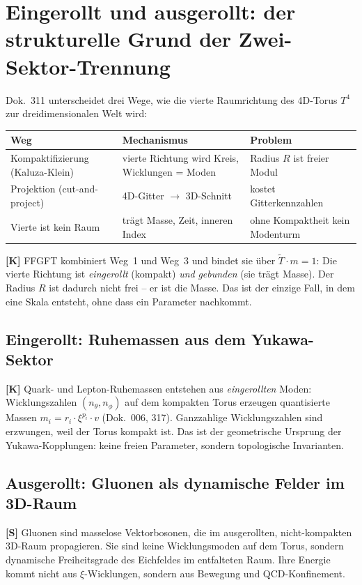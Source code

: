 \section{Eingerollt und ausgerollt: der strukturelle Grund der Zwei-Sektor-Trennung}

Dok.~311 unterscheidet drei Wege, wie die vierte Raumrichtung des
4D-Torus $T^4$ zur dreidimensionalen Welt wird:

\begin{center}
\begin{tabular}{lll}
\toprule
Weg & Mechanismus & Problem \\
\midrule
Kompaktifizierung (Kaluza-Klein) & vierte Richtung wird Kreis, Wicklungen = Moden
  & Radius $R$ ist freier Modul \\
Projektion (cut-and-project) & 4D-Gitter $\to$ 3D-Schnitt
  & kostet Gitterkennzahlen \\
Vierte ist kein Raum & trägt Masse, Zeit, inneren Index
  & ohne Kompaktheit kein Modenturm \\
\bottomrule
\end{tabular}
\end{center}

\textbf{[K]} FFGFT kombiniert Weg~1 und Weg~3 und bindet sie über
$\tilde{T} \cdot m = 1$: Die vierte Richtung ist \emph{eingerollt}
(kompakt) \emph{und} \emph{gebunden} (sie trägt Masse). Der Radius $R$
ist dadurch nicht frei -- er ist die Masse. Das ist der einzige Fall,
in dem eine Skala entsteht, ohne dass ein Parameter nachkommt.

\subsection{Eingerollt: Ruhemassen aus dem Yukawa-Sektor}

\textbf{[K]} Quark- und Lepton-Ruhemassen entstehen aus
\emph{eingerollten} Moden: Wicklungszahlen $(n_\theta, n_\phi)$ auf dem
kompakten Torus erzeugen quantisierte Massen
$m_i = r_i \cdot \xi^{p_i} \cdot v$ (Dok.~006, 317).
Ganzzahlige Wicklungszahlen sind erzwungen, weil der Torus kompakt ist.
Das ist der geometrische Ursprung der Yukawa-Kopplungen: keine freien
Parameter, sondern topologische Invarianten.

\subsection{Ausgerollt: Gluonen als dynamische Felder im 3D-Raum}

\textbf{[S]} Gluonen sind masselose Vektorbosonen, die im
ausgerollten, nicht-kompakten 3D-Raum propagieren. Sie sind keine
Wicklungsmoden auf dem Torus, sondern dynamische Freiheitsgrade des
Eichfeldes im entfalteten Raum. Ihre Energie kommt nicht aus
$\xi$-Wicklungen, sondern aus Bewegung und QCD-Konfinement.

